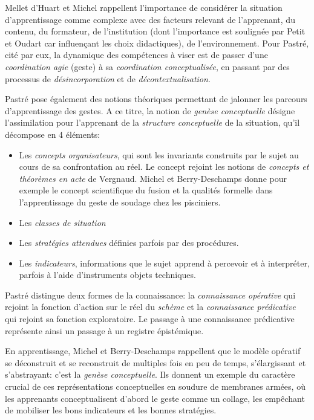 \documentclass{article}
\begin{document}
Mellet d'Huart et Michel \cite{mellet-dhuart_faciliter_2005} rappellent 
l'importance de considérer la situation d'apprentissage comme complexe 
avec des facteurs relevant de l'apprenant, du contenu, du formateur, de 
l'institution (dont l'importance est soulignée par Petit et Oudart 
\cite{petit_apprendre_2017} car influençant les choix didactiques), de 
l'environnement.
Pour Pastré, cité par eux, la dynamique des compétences à viser est de 
passer d'une \emph{coordination agie} (geste) à sa \emph{coordination 
conceptualisée}, en passant par des processus de \emph{désincorporation} 
et de \emph{décontextualisation}.

Pastré pose également des notions théoriques permettant de jalonner les
parcours d'apprentissage des gestes. A ce titre, la notion de 
\emph{genèse conceptuelle} désigne l'assimilation pour l'apprenant de la 
\emph{structure conceptuelle} de la situation, qu'il décompose en 4
éléments:
\begin{itemize}
    \item Les \emph{concepts organisateurs}, qui sont les invariants
    construits par le sujet au cours de sa confrontation au réel. Le
    concept rejoint les notions de \emph{concepts et théorèmes en acte}
    de Vergnaud. Michel et Berry-Deschamps \cite{michel_lapprentissage_2008}
    donne pour exemple le concept scientifique du fusion et la qualités
    formelle dans l'apprentissage du geste de soudage chez les pisciniers.
    \item Les \emph{classes de situation}
    \item Les \emph{stratégies attendues} définies parfois par des
    procédures.
    \item Les \emph{indicateurs}, informations que le sujet apprend à 
    percevoir et à interpréter, parfois à l'aide d'instruments objets
    techniques.
\end{itemize}

Pastré distingue deux formes de la connaissance: la \emph{connaissance
opérative} qui rejoint la fonction d'action sur le réel du \emph{schème}
et la \emph{connaissance prédicative} qui rejoint sa fonction 
exploratoire. Le passage à une connaissance prédicative représente
ainsi un passage à un registre épistémique.

En apprentissage, Michel et Berry-Deschamps \cite{michel_lapprentissage_2008}
rappellent que le modèle opératif se déconstruit et se reconstruit de
multiples fois en peu de temps, s'élargissant et s'abstrayant: c'est la
\emph{genèse conceptuelle}. Ils donnent un exemple du caractère crucial
de ces représentations conceptuelles en soudure de membranes armées, où 
les apprenants conceptualisent d'abord le geste comme un collage, les 
empêchant de mobiliser les bons indicateurs et les bonnes stratégies.
\\
\end{document}
